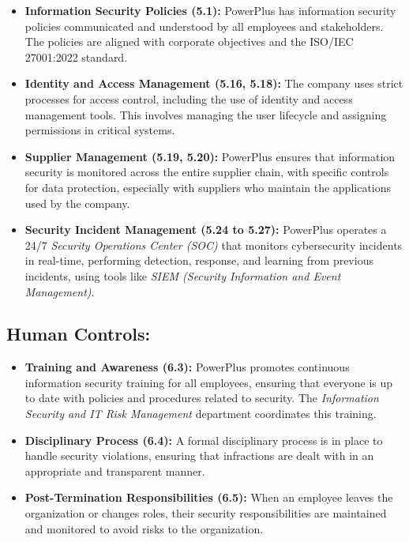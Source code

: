\begin{itemize}
    \item \textbf{Information Security Policies (5.1):} PowerPlus has information security policies communicated and understood by all employees and stakeholders. The policies are aligned with corporate objectives and the ISO/IEC 27001:2022 standard.
    \item \textbf{Identity and Access Management (5.16, 5.18):} The company uses strict processes for access control, including the use of identity and access management tools. This involves managing the user lifecycle and assigning permissions in critical systems.
    \item \textbf{Supplier Management (5.19, 5.20):} PowerPlus ensures that information security is monitored across the entire supplier chain, with specific controls for data protection, especially with suppliers who maintain the applications used by the company.
    \item \textbf{Security Incident Management (5.24 to 5.27):} PowerPlus operates a 24/7 \textit{Security Operations Center (SOC)} that monitors cybersecurity incidents in real-time, performing detection, response, and learning from previous incidents, using tools like \textit{SIEM (Security Information and Event Management)}.
\end{itemize}

\subsection*{Human Controls:}

\begin{itemize}
    \item \textbf{Training and Awareness (6.3):} PowerPlus promotes continuous information security training for all employees, ensuring that everyone is up to date with policies and procedures related to security. The \textit{Information Security and IT Risk Management} department coordinates this training.
    \item \textbf{Disciplinary Process (6.4):} A formal disciplinary process is in place to handle security violations, ensuring that infractions are dealt with in an appropriate and transparent manner.
    \item \textbf{Post-Termination Responsibilities (6.5):} When an employee leaves the organization or changes roles, their security responsibilities are maintained and monitored to avoid risks to the organization.
\end{itemize}


